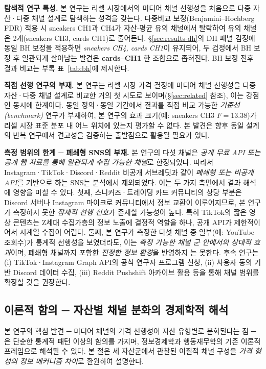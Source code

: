 \documentclass[11pt, a4paper, twocolumn]{article}
\begin{document}
\textbf{탐색적 연구 특성.} 본 연구는 리셀 시장에서의 미디어 채널 선행성을
처음으로 다중 자산·다중 채널 설계로 탐색하는 성격을 갖는다. 다중비교
보정(Benjamini--Hochberg FDR) 적용 시 sneakers CH1과 CH4가 자산-평균
유의 채널에서 탈락하여 유의 채널은 2개(sneakers CH3, cards CH1)로
줄어든다. \S\ref{sec:results-dh}의 DH 패널 검정에 동일 BH 보정을
적용하면 \emph{sneakers CH4, cards CH1}이 유지되어, 두 검정에서 BH
보정 후 일관되게 살아남는 발견은 \textbf{cards--CH1} 한 조합으로
좁혀진다. BH 보정 전후 결과 비교는 부록 표~\ref{tab:bh}에 제시한다.

\textbf{직접 선행 연구의 부재.} 본 연구는 리셀 시장 가격 결정에 미디어
채널 선행성을 다중 자산·다중 채널 설계로 비교한 거의 첫 시도로
보이며(\S\ref{sec:related} 참조), 이는 강점인 동시에 한계이다. 동일
정의·동일 기간에서 결과를 직접 비교 가능한 \emph{기준선(benchmark)}
연구가 부재하여, 본 연구의 효과 크기(예: sneakers CH3 $F=13.38$)가
리셀 시장 표준 분포 내 어느 위치에 있는지 평가할 수 없다. 본 발견은
향후 동일 설계의 반복 연구에서 견고성을 검증하는 출발점으로 활용될
필요가 있다.

\textbf{측정 범위의 한계 ─ 폐쇄형 SNS의 부재.} 본 연구의 다섯 채널은
\emph{공개 무료 API 또는 공개 웹 자료를 통해 일관되게 수집 가능한
채널}로 한정되었다. 따라서 Instagram·TikTok·Discord·Reddit 비공개
서브레딧과 같이 \emph{폐쇄형 또는 비공개 API}를 기반으로 하는 SNS는
분석에서 제외되었다. 이는 두 가지 측면에서 결과 해석에 영향을 미칠 수
있다. 첫째, 스니커즈·트레이딩 카드 커뮤니티의 상당 부분은 Discord
서버나 Instagram 마이크로 커뮤니티에서 정보 교환이 이루어지므로, 본
연구가 측정하지 못한 \emph{잠재적 선행 신호}가 존재할 가능성이 높다.
특히 TikTok의 짧은 영상 콘텐츠는 Z세대 수집가층의 정보 노출에 결정적
역할을 하나, 공개 API가 제한적이어서 시계열 수집이 어렵다. 둘째,
본 연구가 측정한 다섯 채널 중 일부(예: YouTube 조회수)가 통계적
선행성을 보였더라도, 이는 \emph{측정 가능한 채널 군 안에서의 상대적
효과}이며, 폐쇄형 채널까지 포함한 \emph{진정한 정보 환경}을 반영하지
는 못한다. 후속 연구는 (i) TikTok·Instagram Graph API의 공식 연구자
프로그램 신청, (ii) 사용자 동의 기반 Discord 데이터 수집, (iii)
Reddit Pushshift 아카이브 활용 등을 통해 채널 범위를 확장할 것을
권장한다.

\subsection{이론적 함의 ─ 자산별 채널 분화의 경제학적 해석}
\label{sec:discussion-theory}

본 연구의 핵심 발견 ─ 미디어 채널의 가격 선행성이 자산 유형별로 분화된다는 점 ─
은 단순한 통계적 패턴 이상의 함의를 가지며, 정보경제학과 행동재무학의
기존 이론적 프레임으로 해석될 수 있다. 본 절은 세 자산군에서 관찰된
이질적 채널 구성을 \emph{가격 형성의 정보 메커니즘 차이}로 환원하여
설명한다.
\end{document}
